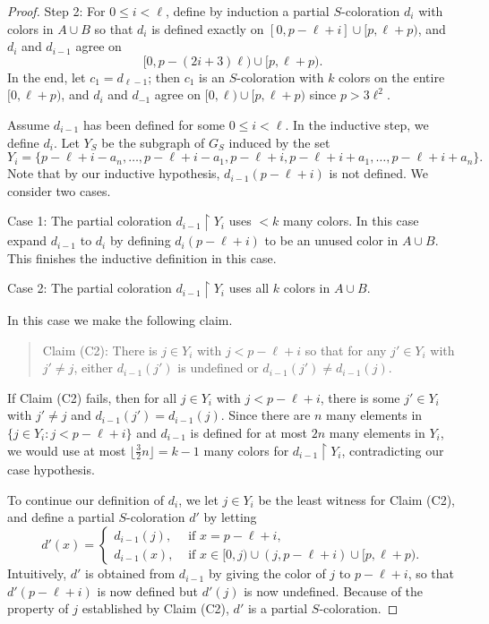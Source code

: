 \documentclass[11pt]{amsart}
\theoremstyle{definition}
\begin{document}
\begin{proof}
Step 2: For $0\leq i<\ell$, define by induction a partial $S$-coloration $d_i$ with colors in $A\cup B$ so that $d_i$ is defined exactly on $[0, p-\ell+i] \cup [p, \ell+p)$, and $d_i$ and $d_{i-1}$ agree on 
$$\big[0, p-(2i+3)\ell\big)\cup \big[p, \ell+p\big). $$
 In the end, let $c_1=d_{\ell-1}$; then $c_1$ is an $S$-coloration with $k$ colors on the entire $[0, \ell+p)$, and $d_i$ and $d_{-1}$ agree on $[0,\ell)\cup [p, \ell+p)$ since $p>3\ell^2$.

Assume $d_{i-1}$ has been defined for some $0\leq i<\ell$. In the inductive step, we define $d_i$. Let $Y_S$ be the subgraph of $G_S$ induced by the set
$$Y_i=\{p-\ell+i-a_n, \dots, p-\ell+i-a_1, p-\ell+i, p-\ell+i+a_1, \dots, p-\ell+i+a_n\}. $$
Note that by our inductive hypothesis, $d_{i-1}(p-\ell+i)$ is not defined. We consider two cases.

Case 1: The partial coloration $d_{i-1}\upharpoonright Y_i$ uses $<k$ many colors. In this case expand $d_{i-1}$ to $d_i$ by defining $d_i(p-\ell+i)$ to be an unused color in $A\cup B$. This finishes the inductive definition in this case.

Case 2: The partial coloration $d_{i-1}\upharpoonright Y_i$ uses all $k$ colors in $A\cup B$. 

In this case we make the following claim.
\begin{quote}
Claim (C2): There is $j\in Y_i$ with $j<p-\ell+i$ so that for any $j'\in Y_i$ with $j'\neq j$, either $d_{i-1}(j')$ is undefined or $d_{i-1}(j')\neq d_{i-1}(j)$. 
\end{quote}
If Claim (C2) fails, then for all $j\in Y_i$ with $j<p-\ell+i$, there is some $j'\in Y_i$ with $j'\neq j$ and $d_{i-1}(j')=d_{i-1}(j)$. Since there are $n$ many elements in $\{ j\in Y_i\colon j<p-\ell+i\}$ and $d_{i-1}$ is defined for at most $2n$ many elements in $Y_i$,  we would use at most $\lfloor \frac{3}{2}n\rfloor=k-1$ many colors for $d_{i-1}\upharpoonright Y_i$, contradicting our case hypothesis.  

To continue our definition of $d_i$, we let $j\in Y_i$ be the least witness for Claim (C2), and define a partial $S$-coloration $d'$ by letting
$$ d'(x)=\left\{\begin{array}{ll} d_{i-1}(j), & \mbox{ if $x=p-\ell+i$,} \\ d_{i-1}(x), & \mbox{ if $x\in [0, j)\cup (j, p-\ell+i)\cup [p, \ell+p)$.}
\end{array}\right. $$
Intuitively, $d'$ is obtained from $d_{i-1}$ by giving the color of $j$ to $p-\ell+i$, so that $d'(p-\ell+i)$ is now defined but $d'(j)$ is now undefined. Because of the property of $j$ established by Claim (C2), $d'$ is a partial $S$-coloration.


\end{proof}
\end{document}

